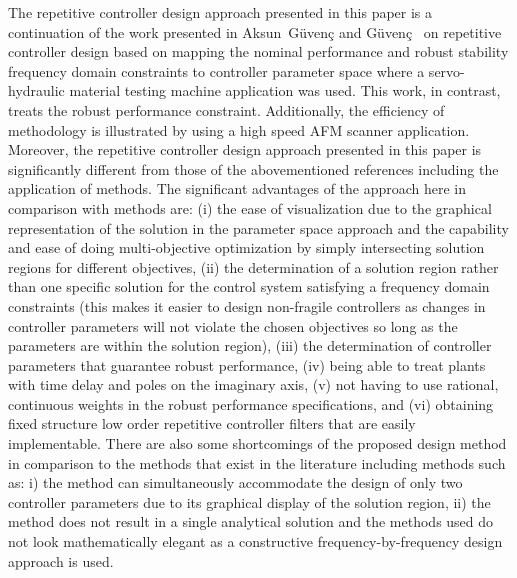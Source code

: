 \documentclass[12pt,draftcls,onecolumn]{IEEEtran}
\begin{document}
The repetitive controller design approach presented in this paper is a continuation of the work presented in Aksun~G\"uven\c{c} and
G\"uven\c{c}~\cite{GuG:06} on repetitive controller design based on mapping the nominal performance and robust stability frequency domain constraints to controller parameter space where a servo-hydraulic material testing machine application was used. This work, in contrast, treats the robust performance constraint. Additionally, the efficiency of methodology is illustrated by using a high speed AFM scanner application. Moreover, the repetitive controller design approach presented in this paper is significantly different from those of the abovementioned references including the application of  methods. The significant advantages of the approach here in comparison with  methods are: (i) the ease of visualization due to the graphical representation of the solution in the parameter space approach and the capability and ease of doing multi-objective optimization by simply intersecting solution regions for different objectives, (ii) the
determination of a solution region rather than one specific solution for the control system satisfying a frequency domain
constraints (this makes it easier to design non-fragile controllers as changes in controller parameters will not violate the chosen objectives so long as the parameters are within the solution region), (iii) the determination of controller parameters that guarantee robust performance, (iv) being able to treat plants with time delay and poles on the imaginary axis, (v) not having to use rational, continuous weights in the robust performance specifications, and (vi) obtaining fixed structure low order repetitive controller filters that are easily implementable. There
are also some shortcomings of the proposed design method in comparison to the methods that exist in the literature including  methods such as: i) the method can simultaneously accommodate the design of only two controller parameters due to
its graphical display of the solution region, ii) the method does not result in a single analytical solution and the methods used do
not look mathematically elegant as a constructive frequency-by-frequency design approach is used.
\end{document}
